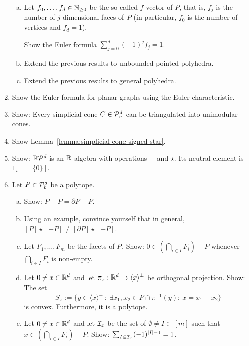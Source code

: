 \begin{enumerate}
\begin{enumerate}[(a)]
      \item Let $f_0, \ldots, f_d \in \mathbb{N}_{\geq 0}$ be the so-called $f$-vector of $P$, that is,
        $f_j$ is the number of $j$-dimensional faces of $P$ (in particular, $f_0$ is the number of vertices and $f_d = 1$).

        Show the Euler formula $\sum_{j = 0}^d (-1)^j f_j = 1$.

      \item Extend the previous results to unbounded pointed polyhedra.

      \item Extend the previous results to general polyhedra.
    \end{enumerate}

  \item Show the Euler formula for planar graphs using the Euler characteristic.

  \item Show: Every simplicial cone $C \in \mathcal{P}_v^d$ can be triangulated into unimodular cones.

  \item Show Lemma~\ref{lemma:simplicial-cone-signed-star}.

  \item Show: $\mathbb{R} \mathcal{P}^d$ is an $\mathbb{R}$-algebra with operations $+$ and $\star$.
    Its neutral element is $1_\star = [\{0\}]$.

  \item Let $P \in \mathcal{P}_b^d$ be a polytope.
  \begin{enumerate}[(a)]
    \item Show: $P - P = \partial P - P$.

    \item Using an example, convince yourself that in general, $[P] \star [-P] \neq [\partial P] \star [-P]$.

    \item Let $F_1, \ldots, F_m$ be the facets of $P$.
      Show: $0 \in (\bigcap_{i \in I} F_i) - P$ whenever $\bigcap_{i \in I} F_i$ is non-empty.

    \item Let $0 \neq x \in \mathbb{R}^d$ and let $\pi_x : \mathbb{R}^d \to \langle x \rangle^\bot$ be orthogonal projection.
      Show: The set
      \[
        S_x := \{ y \in \langle x \rangle^\bot ~:~ \exists x_1, x_2 \in P \cap \pi^{-1}(y) :~ x = x_1 - x_2 \}
      \]
      is convex.
      Furthermore, it is a polytope.

    \item
      Let $0 \neq x \in \mathbb{R}^d$ and
      let $\mathcal{I}_x$ be the set of $\emptyset \neq I \subset [m]$ such that $x \in (\bigcap_{i \in I} F_i) - P$.
      Show: $\sum_{I \in \mathcal{I}_x} (-1)^{|I|-1} = 1$.


\end{enumerate}
\end{enumerate}
